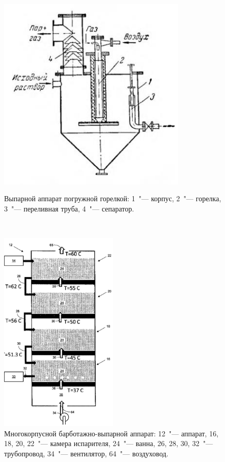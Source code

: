 \begin{figure}
\centering
\begin{minipage}{.45\textwidth}
\centering
\includegraphics[width=0.8\textwidth]{figures/temp/kasatkin.jpg}
\caption[Выпарной аппарат погружной горелкой]{Выпарной аппарат погружной горелкой:  1~"--- корпус, 2~"--- горелка, 3~"--- переливная труба, 4~"--- сепаратор.}\label{fig:evaporation_app_kasatkin}
\end{minipage}%
~
\begin{minipage}{.45\textwidth}
\centering
\includegraphics[width=0.5\textwidth]{figures/temp/Govindan.jpg}
\caption[Многокорпусной барботажно-выпарной аппарат]{Многокорпусной барботажно-выпарной аппарат: 12~"--- аппарат, 16, 18, 20, 22~"--- камера испарителя, 24~"--- ванна, 26, 28, 30, 32~"--- трубопровод, 34~"--- вентилятор, 64~"--- воздуховод.}\label{fig:evaporation_app_govindan}
\end{minipage}
\end{figure}


